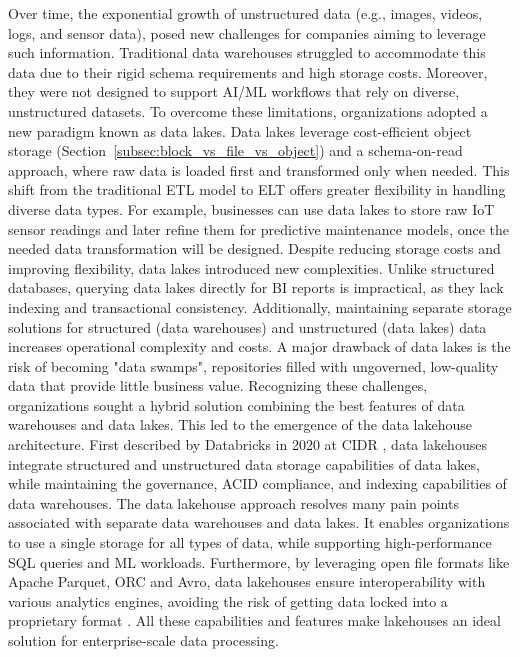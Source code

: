 Over time, the exponential growth of unstructured data (e.g., images, videos, logs, and sensor data), posed new challenges for companies aiming to leverage such information. Traditional data warehouses struggled to accommodate this data due to their rigid schema requirements and high storage costs. Moreover, they were not designed to support \gls{AI}/\gls{ML} workflows that rely on diverse, unstructured datasets. To overcome these limitations, organizations adopted a new paradigm known as data lakes. Data lakes leverage cost-efficient object storage (Section~\ref{subsec:block_vs_file_vs_object}) and a schema-on-read approach, where raw data is loaded first and transformed only when needed. This shift from the traditional \gls{ETL} model to \gls{ELT} offers greater flexibility in handling diverse data types. For example, businesses can use data lakes to store raw IoT sensor readings and later refine them for predictive maintenance models, once the needed data transformation will be designed. Despite reducing storage costs and improving flexibility, data lakes introduced new complexities. Unlike structured databases, querying data lakes directly for \gls{BI} reports is impractical, as they lack indexing and transactional consistency. Additionally, maintaining separate storage solutions for structured (data warehouses) and unstructured (data lakes) data increases operational complexity and costs. A major drawback of data lakes is the risk of becoming "data swamps", repositories filled with ungoverned, low-quality data that provide little business value. Recognizing these challenges, organizations sought a hybrid solution combining the best features of data warehouses and data lakes. This led to the emergence of the data lakehouse architecture. First described by Databricks in 2020 at \gls{CIDR} \cite{lakehouse2021}, data lakehouses integrate structured and unstructured data storage capabilities of data lakes, while maintaining the governance, \gls{ACID} compliance, and indexing capabilities of data warehouses. The data lakehouse approach resolves many pain points associated with separate data warehouses and data lakes. It enables organizations to use a single storage for all types of data, while supporting high-performance SQL queries and \gls{ML} workloads. Furthermore, by leveraging open file formats like Apache Parquet, ORC and Avro, data lakehouses ensure interoperability with various analytics engines, avoiding the risk of getting data locked into a proprietary format \cite{mazumdarDataLakehouseData2023}. All these capabilities and features make lakehouses an ideal solution for enterprise-scale data processing. 

